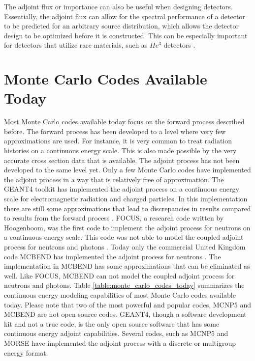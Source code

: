 The adjoint flux or importance can also be useful when designing
detectors. Essentially, the adjoint flux can allow for the spectral performance 
of a detector to be predicted for an arbitrary source distribution, which 
allows the detector design to be optimized before it is constructed. This can 
be especially important for detectors that utilize rare materials, such as 
$He^3$ detectors \citep{sjoden_deterministic_2002}.

\section{Monte Carlo Codes Available Today}
\label{sec:monte_carlo_codes}
Most Monte Carlo codes available today focus on the forward process described
before. The forward process has been developed to a level where very few 
approximations are used. For instance, it is very common to treat radiation
histories on a continuous energy scale. This is also made possible by the very
accurate cross section data that is available. The adjoint process has not been 
developed to the same level yet. Only a few Monte Carlo codes have implemented
the adjoint process in a way that is relatively free of approximation. The
GEANT4 toolkit has implemented the adjoint process on a continuous energy 
scale for electromagnetic radiation and charged particles. In this implementation there are still some approximations that lead to discrepancies in results 
compared to results from the forward process 
\citep{desorgher_implementation_2010}. FOCUS, a research code written by 
Hoogenboom, was the first code to implement the adjoint process for neutrons
on a continuous energy scale. This code was not able to model the coupled 
adjoint process for neutrons and photons \citep{hoogenboom_adjoint_1977}. Today 
only the commercial United Kingdom code MCBEND has implemented the adjoint
process for neutrons \citep{grimstone_extension_1998}. The implementation in
MCBEND has some approximations that can be eliminated as well. Like FOCUS, 
MCBEND can not model the coupled adjoint process for neutrons and photons. 
Table \ref{table:monte_carlo_codes_today} summarizes the continuous energy 
modeling capabilities of most Monte Carlo codes available today. Please note 
that two of the most powerful and popular codes, MCNP5 and MCBEND are not open 
source codes. GEANT4, though a software development kit and not a true code,
is the only open source software that has some continuous energy adjoint 
capabilities. Several codes, such as MCNP5 and MORSE have implemented the 
adjoint process with a discrete or multigroup energy format.

